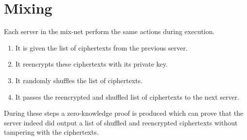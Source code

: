 \documentclass[18pt,a4paper]{article}
\begin{document}
\section*{Mixing}

Each server in the mix-net perform the same actions during execution.

\begin{enumerate}
\item It is given the list of ciphertexts from the previous server.
\item It reencrypts these ciphertexts with its private key.
\item It randomly shuffles the list of ciphertexts.
\item It passes the reencrypted and shuffled list of ciphertexts to the next server.
\end{enumerate}

During these steps a zero-knowledge proof is produced which can prove that the server indeed did output a list of shuffled and reencrypted ciphertexts without tampering with the ciphertexts.

\begin{center}
\end{center}
\end{document}
